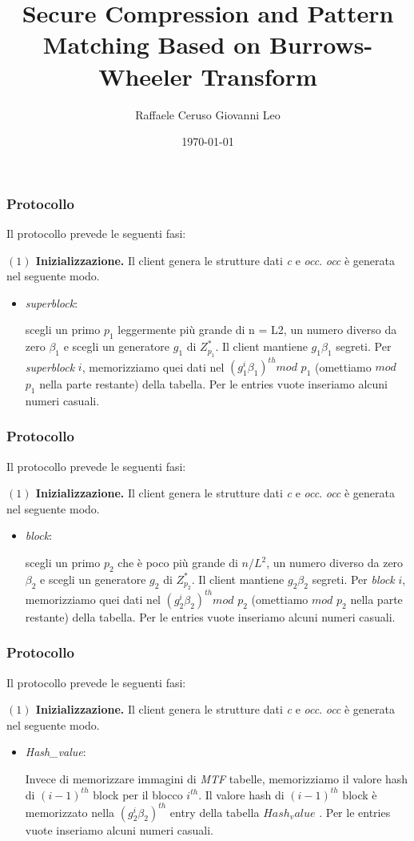 \documentclass{beamer}
\title{Secure Compression and Pattern Matching Based on Burrows-Wheeler Transform}
\author{Raffaele Ceruso Giovanni Leo}
\date{\today}
\begin{document}
\begin{frame}
	\titlepage
\end{frame}
\begin{frame}
\frametitle{Protocollo}
Il protocollo prevede le seguenti fasi:

\textbf{$(1)$ Inizializzazione.} Il client genera le strutture dati \textit{c} e \textit{occ}. \textit{occ} è generata nel seguente modo.

\begin{itemize}
	\item \textit{superblock}:
	
	scegli un primo $ p_{1} $ leggermente più grande
	di n = L2, un numero diverso da zero $ \beta_{1} $ e scegli un generatore
	$g_{1}$ di $ Z^{*}_{p_{1}} $. Il client mantiene $ g_{1} \beta_{1} $ segreti. Per \textit{superblock} $ i $, memorizziamo quei dati nel $ (g^{i}_{1}\beta_{1})^{th} mod$ $p_{1}$
	(omettiamo $mod$ $ p_{1}$ nella parte restante) della tabella.
	Per le entries vuote inseriamo alcuni numeri casuali.
\end{itemize}
\end{frame}
\begin{frame}
\frametitle{Protocollo}
Il protocollo prevede le seguenti fasi:

\textbf{$(1)$ Inizializzazione.} Il client genera le strutture dati \textit{c} e \textit{occ}. \textit{occ} è generata nel seguente modo.

\begin{itemize}
	\item \textit{block}:
	
	scegli un primo $ p_{2} $ che è poco più grande di $n/L^{2}$,
	un numero diverso da zero $ \beta_{2} $ e scegli un generatore $g_{2}$ di $ Z^{*}_{p_{2}} $.
	Il client mantiene $ g_{2} \beta_{2} $ segreti. Per \textit{block} $ i $, memorizziamo quei dati nel $ (g^{i}_{2}\beta_{2})^{th} mod$ $p_{2}$
	(omettiamo $mod$ $ p_{2}$ nella parte restante) della tabella.
	Per le entries vuote inseriamo alcuni numeri casuali.
\end{itemize}
\end{frame}
\begin{frame}
\frametitle{Protocollo}
Il protocollo prevede le seguenti fasi:

\textbf{$(1)$ Inizializzazione.} Il client genera le strutture dati \textit{c} e \textit{occ}. \textit{occ} è generata nel seguente modo.

\begin{itemize}
	\item \textit{Hash\_value}:
	
	Invece di memorizzare immagini di \textit{MTF}
	tabelle, memorizziamo il valore hash di $ (i-1)^{th} $ block
	per il blocco $ i^{th} $. Il valore hash di $ (i-1)^{th} $ block
	è memorizzato nella $ (g^{i}_{2}\beta_{2})^{th}$ entry della tabella $Hash_value$ .
	Per le entries vuote inseriamo alcuni numeri casuali.
\end{itemize}
\end{frame}
\end{document}
